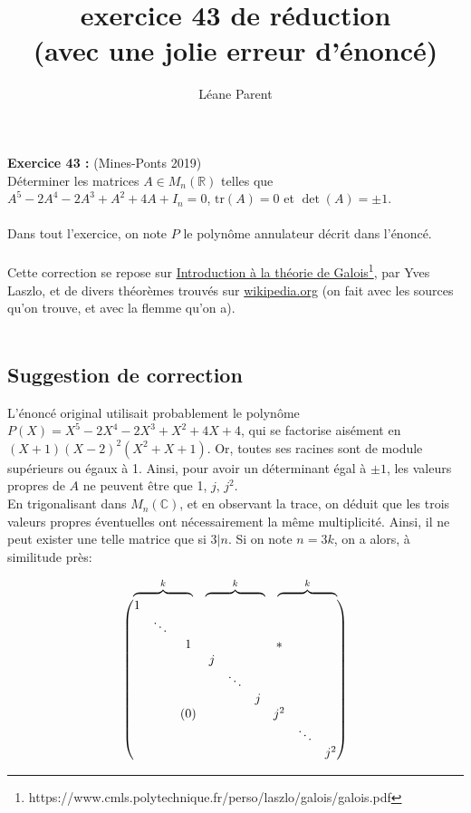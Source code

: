\documentclass[a4paper, 12pt]{article}
\title{ exercice 43 de réduction \\
	\large (avec une jolie erreur d'énoncé) }
\author{Léane Parent}
\begin{document}
	
	\maketitle
	\textbf{Exercice 43 : } (Mines-Ponts 2019) \\
	Déterminer les matrices $ A \in M_n (\mathbb R) $ telles que $A^5 -2A^4 -2A^3 +A^2 +4A+I_n = 0$, $\mathrm{tr} (A) = 0$ et $\det (A) = \pm 1$.
	\\ \\
	Dans tout l'exercice, on note $P$ le polynôme annulateur décrit dans l'énoncé. \\ \\
	Cette correction se repose sur \underline{Introduction à la théorie de Galois}\footnote{https://www.cmls.polytechnique.fr/perso/laszlo/galois/galois.pdf}, par Yves Laszlo, et de divers théorèmes trouvés sur \url{wikipedia.org} (on fait avec les sources qu'on trouve, et avec la flemme qu'on a).
	\\ \\
	\subsection{Suggestion de correction}
	L'énoncé original utilisait probablement le polynôme $ P(X) = X^5 -2X^4 -2X^3 + X^2 + 4X + 4 $, qui se factorise aisément en $ (X+1)(X-2)^2(X^2+X+1) $. Or, toutes ses racines sont de module supérieurs ou égaux à 1. Ainsi, pour avoir un déterminant égal à $\pm 1$, les valeurs propres de $A$ ne peuvent être que 1, $j$, $j^2$. \\
	En trigonalisant dans $ M_n (\mathbb C) $, et en observant la trace, on déduit que les trois valeurs propres éventuelles ont nécessairement la même multiplicité. Ainsi, il ne peut exister une telle matrice que si $3 | n$.
	Si on note $n=3k$, on a alors, à similitude près:
	
	$$
	\begin{array}{c}
		\begin{array}{ccc}
			\overbrace{\hphantom{\begin{array}{ccc}x&x&x\end{array}}}^{k}
			&
			\overbrace{\hphantom{\begin{array}{ccc}x&x&x\end{array}}}^{k}
			&
			\overbrace{\hphantom{\begin{array}{ccc}x&x&x\end{array}}}^{k}
		\end{array}
		\\[-0.3em]
		\begin{pmatrix}
			1 \\
			& \ddots \\
			& & 1 & & & & * \\
			& & & j \\
			& & & & \ddots \\
			& & & & & j \\
			& & (0) & & & & j^2 \\
			& & & & & & & \ddots \\
			& & & & & & & & j^2
		\end{pmatrix}
	\end{array}
	$$
	
\end{document}
